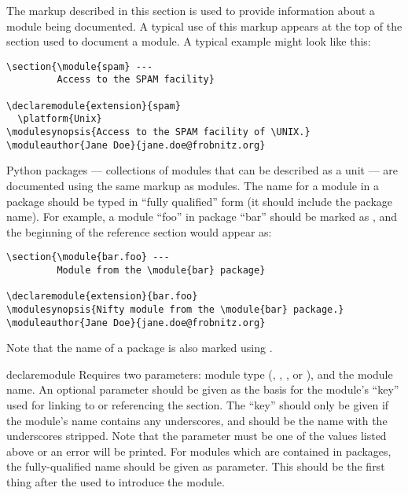 \documentclass{howto}
\begin{document}
  The markup described in this section is used to provide information
  about a module being documented.  A typical use of this markup
  appears at the top of the section used to document a module.  A
  typical example might look like this:

\begin{verbatim}
\section{\module{spam} ---
         Access to the SPAM facility}

\declaremodule{extension}{spam}
  \platform{Unix}
\modulesynopsis{Access to the SPAM facility of \UNIX.}
\moduleauthor{Jane Doe}{jane.doe@frobnitz.org}
\end{verbatim}

  Python packages --- collections of modules that can
  be described as a unit --- are documented using the same markup as
  modules.  The name for a module in a package should be typed in
  ``fully qualified'' form (it should include the package name).
  For example, a module ``foo'' in package ``bar'' should be marked as
  , and the beginning of the reference
  section would appear as:

\begin{verbatim}
\section{\module{bar.foo} ---
         Module from the \module{bar} package}

\declaremodule{extension}{bar.foo}
\modulesynopsis{Nifty module from the \module{bar} package.}
\moduleauthor{Jane Doe}{jane.doe@frobnitz.org}
\end{verbatim}

  Note that the name of a package is also marked using
  .

  \begin{macrodesc}{declaremodule}{}
    Requires two parameters: module type (,
    , , or \samp{}), and the module
    name.  An optional parameter should be given as the basis for the
    module's ``key'' used for linking to or referencing the section.
    The ``key'' should only be given if the module's name contains any
    underscores, and should be the name with the underscores stripped.
    Note that the  parameter must be one of the values
    listed above or an error will be printed.  For modules which are
    contained in packages, the fully-qualified name should be given as
     parameter.  This should be the first thing after the
     used to introduce the module.
  \end{macrodesc}
\end{document}

